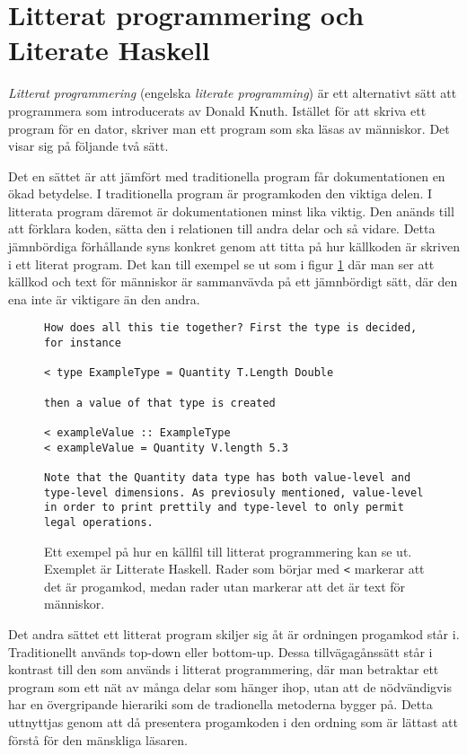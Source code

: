 \section{Litterat programmering och Literate Haskell}
\label{sec:lhs}
\begin{draft}
\textit{Litterat programmering} (engelska \textit{literate programming}) är ett
alternativt sätt att programmera som introducerats av Donald Knuth.\cite{knuth}
Istället för att skriva ett program för en dator, skriver man ett program som
ska läsas av människor. Det visar sig på följande två sätt.

Det en sättet är att jämfört med traditionella program får dokumentationen en
ökad betydelse. I traditionella program är programkoden den viktiga delen. I
litterata program däremot är dokumentationen minst lika viktig. Den anänds till
att förklara koden, sätta den i relationen till andra delar och så vidare.
Detta jämnbördiga förhållande syns konkret genom att titta på hur källkoden är
skriven i ett literat program. Det kan till exempel se ut som i figur
\ref{fig:litterate_haskell_exempel} där man ser att källkod och text för
människor är sammanvävda på ett jämnbördigt sätt, där den ena inte är viktigare
än den andra. 

\begin{figure}[tph]
  \begin{lstlisting}[language={}]
How does all this tie together? First the type is decided, for instance

< type ExampleType = Quantity T.Length Double

then a value of that type is created

< exampleValue :: ExampleType
< exampleValue = Quantity V.length 5.3

Note that the Quantity data type has both value-level and type-level dimensions. As previosuly mentioned, value-level in order to print prettily and type-level to only permit legal operations.
  \end{lstlisting}
  \caption{Ett exempel på hur en källfil till litterat programmering kan se ut. Exemplet är Litterate Haskell. Rader som börjar med \texttt{<} markerar att det är progamkod, medan rader utan markerar att det är text för människor.}
  \label{fig:litterate_haskell_exempel}
\end{figure}

Det andra sättet ett litterat program skiljer sig åt är ordningen progamkod
står i. Traditionellt används top-down eller bottom-up. Dessa tillvägagånssätt
står i kontrast till den som används i litterat programmering, där man
betraktar ett program som ett nät av många delar som hänger ihop, utan att de
nödvändigvis har en övergripande hierariki som de tradionella metoderna bygger
på. Detta uttnyttjas genom att då presentera progamkoden i den ordning som är
lättast att förstå för den mänskliga läsaren.


\end{draft}
